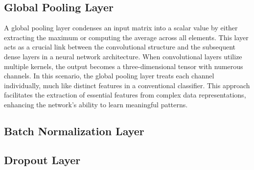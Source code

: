 \documentclass[]{interact}
\theoremstyle{plain}%
\theoremstyle{definition}
\theoremstyle{remark}
\begin{document}
\subsection{Global Pooling Layer}\label{global-pooling-layer}

A global pooling layer condenses an input matrix into a scalar value by
either extracting the maximum or computing the average across all
elements. This layer acts as a crucial link between the convolutional
structure and the subsequent dense layers in a neural network
architecture. When convolutional layers utilize multiple kernels, the
output becomes a three-dimensional tensor with numerous channels. In
this scenario, the global pooling layer treats each channel
individually, much like distinct features in a conventional classifier.
This approach facilitates the extraction of essential features from
complex data representations, enhancing the network's ability to learn
meaningful patterns.

\subsection{Batch Normalization Layer}\label{batch-normalization-layer}

\subsection{Dropout Layer}\label{dropout-layer}



\end{document}
